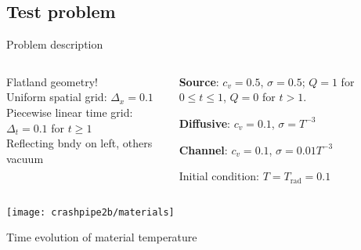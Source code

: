 \documentclass{beamer}
\begin{document}
\subsection{Test problem}
\begin{frame}{Problem description}
  \begin{columns}[t]
    \begin{column}{.48\textwidth}
      Flatland geometry!
      \\Uniform spatial grid: $\Delta_x=0.1$
      \\Piecewise linear time grid: $\Delta_t=0.1$ for $t \ge 1$
      \\Reflecting bndy on left, others vacuum
    \end{column}
    \begin{column}{.48\textwidth}
      \textcolor[rgb]{0,0,1}{\textbf{Source}}: $c_v=0.5$, $\sigma=0.5$;
      $Q=1$ for $0 \le t \le 1$, $Q=0$ for $t > 1$.

      \textcolor[rgb]{1,0,0}{\textbf{Diffusive}}: $c_v=0.1$,
      $\sigma=T^{-3}$

      \textcolor[rgb]{0.1,0.9,0.1}{\textbf{Channel}}: $c_v=0.1$,
      $\sigma=0.01 T^{-3}$

      Initial condition: $T=T_\text{rad}=0.1$
    \end{column}
  \end{columns}
\begin{center}
  \texttt{[image: crashpipe2b/materials]}
\end{center}
\end{frame}

\begin{frame}{Time evolution of material temperature}
%
%
%
%
%
%
%
%
%
%
%
\end{frame}
\end{document}

